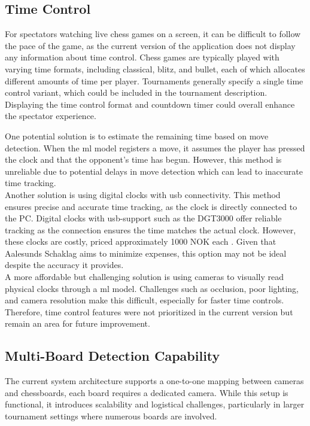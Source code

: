 \subsection{Time Control}
For spectators watching live chess games on a screen, it can be difficult to follow the pace of the game, as the current version of the application does not display any information about time control. Chess games are typically played with varying time formats, including \gls{classical}, \gls{blitz}, and \gls{bullet}, each of which allocates different amounts of time per player. Tournaments generally specify a single time control variant, which could be included in the tournament description. Displaying the time control format and countdown timer could overall enhance the spectator experience. \\

\newpage

One potential solution is to estimate the remaining time based on move detection. When the \gls{ml} model registers a move, it assumes the player has pressed the clock and that the opponent’s time has begun. However, this method is unreliable due to potential delays in move detection which can lead to inaccurate time tracking. \\

Another solution is using digital clocks with \gls{usb} connectivity. This method ensures precise and accurate time tracking, as the clock is directly connected to the PC. Digital clocks with \gls{usb}-support such as the DGT3000 offer reliable tracking as the connection ensures the time matches the actual clock. However, these clocks are costly, priced approximately 1000 NOK each \cite{sjakkbutikken:dgt-clock}. Given that Aalesunds Schaklag aims to minimize expenses, this option may not be ideal despite the accuracy it provides. \\

A more affordable but challenging solution is using cameras to visually read physical clocks through a \gls{ml} model. Challenges such as occlusion, poor lighting, and camera resolution make this difficult, especially for faster time controls. \\

Therefore, time control features were not prioritized in the current version but remain an area for future improvement.

\subsection{Multi-Board Detection Capability}
The current system architecture supports a one-to-one mapping between cameras and chessboards, each board requires a dedicated camera. While this setup is functional, it introduces scalability and logistical challenges, particularly in larger tournament settings where numerous boards are involved. \\


